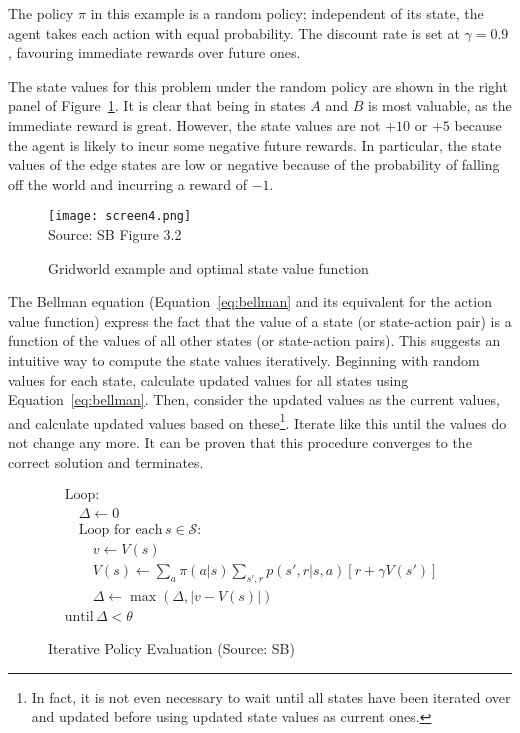 The policy $\pi$ in this example is a random policy; independent of its state, the agent takes each action with equal probability. The discount rate is set at $\gamma = 0.9$, favouring immediate rewards over future ones.

The state values for this problem under the random policy are shown in the right panel of Figure~\ref{fig:sb32}. It is clear that being in states $A$ and $B$ is most valuable, as the immediate reward is great. However, the state values are not $+10$ or $+5$ because the agent is likely to incur some negative future rewards. In particular, the state values of the edge states are low or negative because of the probability of falling off the world and incurring a reward of $-1$. 

\begin{figure}
\centering
\texttt{[image: screen4.png]} \\

\scriptsize Source: SB Figure 3.2 \normalsize
\caption{Gridworld example and optimal state value function}
\label{fig:sb32}
\end{figure}

The Bellman equation (Equation~\ref{eq:bellman} and its equivalent for the action value function) express the fact that the value of a state (or state-action pair) is a function of the values of all other states (or state-action pairs). This suggests an intuitive way to compute the state values iteratively. Beginning with random values for each state, calculate updated values for all states using Equation~\ref{eq:bellman}. Then, consider the updated values as the current values, and calculate updated values based on these\footnote{In fact, it is not even necessary to wait until all states have been iterated over and updated before using updated state values as current ones.}. Iterate like this until the values do not change any more. It can be proven that this procedure converges to the correct solution and terminates. 


\begin{figure}
\small
\begin{tcolorbox}[colback=code]
\vspace{-\baselineskip}
\begin{align*}
&\text{Loop:} \\
&\quad \Delta \leftarrow 0 \\
&\quad \text{Loop for each}\, s \in \mathcal{S}: \\
&\quad \quad v \leftarrow V(s) \\
&\quad \quad V(s) \leftarrow \sum\nolimits_a \pi(a|s) \sum\nolimits_{s', r} p(s', r|s, a)[r + \gamma V(s')] \hspace{1in} \\
&\quad \quad \Delta \leftarrow \max (\Delta, |v - V(s)|) \\
&\text{until}\, \Delta < \theta
\end{align*}
\end{tcolorbox}
\caption{Iterative Policy Evaluation (Source: SB)}
\label{fig:policyiteration}
\end{figure}


